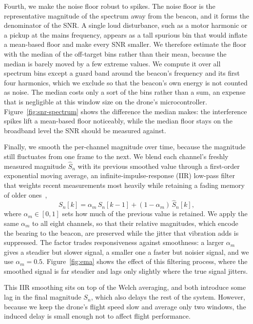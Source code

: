 Fourth, we make the noise floor robust to spikes. The noise floor is the representative magnitude of the spectrum away from the beacon, and it forms the denominator of the SNR. A single loud disturbance, such as a motor harmonic or a pickup at the mains frequency, appears as a tall spurious bin that would inflate a mean-based floor and make every SNR smaller. We therefore estimate the floor with the median of the off-target bins rather than their mean, because the median is barely moved by a few extreme values. We compute it over all spectrum bins except a guard band around the beacon's frequency and its first four harmonics, which we exclude so that the beacon's own energy is not counted as noise. The median costs only a sort of the bins rather than a sum, an expense that is negligible at this window size on the drone's microcontroller. Figure~\ref{fig:snr-spectrum} shows the difference the median makes: the interference spikes lift a mean-based floor noticeably, while the median floor stays on the broadband level the SNR should be measured against.

Finally, we smooth the per-channel magnitude over time, because the magnitude still fluctuates from one frame to the next. We blend each channel's freshly measured magnitude $\hat{S}_n$ with its previous smoothed value through a first-order exponential moving average, an infinite-impulse-response (IIR) low-pass filter that weights recent measurements most heavily while retaining a fading memory of older ones~\cite{oppenheim1999dsp},
\begin{equation}
S_n[k] = \alpha_m\, S_n[k-1] + (1 - \alpha_m)\,\hat{S}_n[k],
\label{eq:magiir}
\end{equation}
where $\alpha_m \in [0,1]$ sets how much of the previous value is retained. We apply the same $\alpha_m$ to all eight channels, so that their relative magnitudes, which encode the bearing to the beacon, are preserved while the jitter that vibration adds is suppressed. The factor trades responsiveness against smoothness: a larger $\alpha_m$ gives a steadier but slower signal, a smaller one a faster but noisier signal, and we use $\alpha_m = 0.5$. Figure~\ref{fig:ema} shows the effect of this filtering process, where the smoothed signal is far steadier and lags only slightly where the true signal jitters.

This IIR smoothing sits on top of the Welch averaging, and both introduce some lag in the final magnitude $S_n$, which also delays the rest of the system. However, because we keep the drone's flight speed slow and average only two windows, the induced delay is small enough not to affect flight performance.

